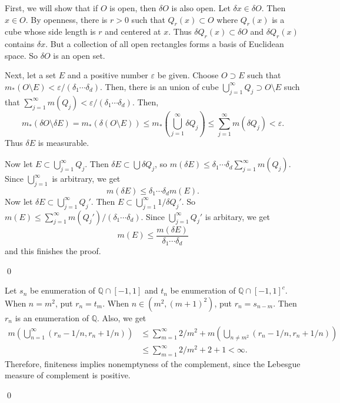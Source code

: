 \begin{exercise}[1.7] \hfill
	
	First, we will show that if $O$ is open, then $\delta O$ is also open.
	Let $\delta x \in \delta O$.
	Then $x \in O$.
	By openness, there is $r>0$ such that $Q_r (x) \subset O$ where $Q_r(x)$ is a cube whose side length is $r$ and centered at $x$.
	Thus $\delta Q_r(x) \subset \delta O$ and $\delta Q_r(x)$ contains $\delta x$.
	But a collection of all open rectangles forms a basis of Euclidean space.
	So $\delta O$ is an open set.

	Next, let a set $E$ and a positive number $\varepsilon$ be given.
	Choose $O \supset E$ such that $m_* (O \setminus E) < \varepsilon / (\delta_1 \cdots \delta_d)$.
	Then, there is an union of cube $\bigcup_{j=1}^\infty Q_j \supset O\setminus E$ such that
	$\sum_{j=1}^\infty m(Q_j) < \varepsilon/(\delta_1 \cdots \delta_d)$.
	Then,
	\[
		m_*(\delta O \setminus \delta E) = m_*(\delta (O\setminus E)) \leq m_* (\bigcup_{j=1}^\infty \delta Q_j) \leq \sum_{j=1}^\infty m(\delta Q_j) < \varepsilon.
	\]
	Thus $\delta E$ is measurable.

	Now let $E \subset \bigcup_{j=1}^\infty Q_j$.
	Then $\delta E \subset \bigcup \delta Q_j$, so $m(\delta E) \leq \delta_1 \cdots \delta_d \sum_{j=1}^\infty m(Q_j).$
	Since $\bigcup_{j=1}^\infty$ is arbitrary, we get
	\[
		m(\delta E) \leq \delta_1 \cdots \delta_d m(E).
	\]
	Now let $\delta E \subset \bigcup_{j=1}^\infty Q_j'.$
	Then $E \subset \bigcup_{j=1}^\infty 1/\delta Q_j'.$
	So $m(E) \leq \sum_{j=1}^\infty m(Q_j') / (\delta_1 \cdots \delta_d).$
	Since $\bigcup_{j=1}^\infty Q_j'$ is arbitary, we get
	\[
		m(E) \leq \frac{m(\delta E)}{\delta_1 \cdots \delta_d}
	\]
	and this finishes the proof.

	\qed
\end{exercise}

\begin{exercise}[1.24] \hfill
	
	Let $s_n$ be enumeration of $\mathbb{Q} \cap \left[ -1, 1 \right]$ and $t_n$ be enumeration of $\mathbb{Q} \cap \left[ -1, 1 \right]^c$.
	When $n = m^2$, put $r_n = t_m$.
	When $n \in \left( m^2, (m+1)^2 \right)$, put $r_n = s_{n-m}$.
	Then $r_n$ is an enumeration of $\mathbb{Q}$.
	Also, we get
	\[
		\begin{split}
			m\left( \bigcup_{n=1}^\infty \left( r_n - 1/n, r_n + 1/n \right) \right)
			& \leq \sum_{m=1}^\infty 2/m^2 + m\left( \bigcup_{n \ne m^2} \left( r_n - 1/n, r_n + 1/n \right) \right) \\
			& \leq \sum_{m=1}^\infty 2/m^2 + 2+ 1 < \infty.
		\end{split}
	\]
	Therefore, finiteness implies nonemptyness of the complement, since the Lebesgue measure of complement is positive.

\qed
\end{exercise}


